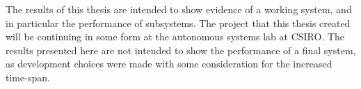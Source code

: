 
The results of this thesis are intended to show evidence of a working system, and in particular the performance of subsystems. The project that this thesis created will be continuing in some form at the autonomous systems lab at CSIRO. The results presented here are not intended to show the performance of a final system, as development choices were made with some consideration for the increased time-span.


